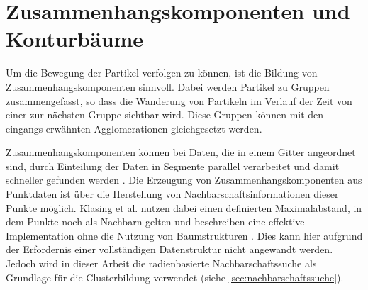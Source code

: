 

\section{Zusammenhangskomponenten und Konturbäume}

Um die Bewegung der Partikel verfolgen zu können, ist die Bildung von Zusammenhangskomponenten sinnvoll. Dabei werden Partikel zu Gruppen zusammengefasst, so dass die Wanderung von Partikeln im Verlauf der Zeit von einer zur nächsten Gruppe sichtbar wird. Diese Gruppen können mit den eingangs erwähnten Agglomerationen gleichgesetzt werden.

Zusammenhangskomponenten können bei Daten, die in einem Gitter angeordnet sind, durch Einteilung der Daten in Segmente parallel verarbeitet und damit schneller gefunden werden \cite{trevor2013efficient}. Die Erzeugung von Zusammenhangskomponenten aus Punktdaten ist über die Herstellung von Nachbarschaftsinformationen dieser Punkte möglich. Klasing et al. nutzen dabei einen definierten Maximalabstand, in dem Punkte noch als Nachbarn gelten und beschreiben eine effektive Implementation ohne die Nutzung von Baumstrukturen \cite{klasing2008efficientSegmentationOf3DLaserData}. Dies kann hier aufgrund der Erfordernis einer vollständigen Datenstruktur nicht angewandt werden. Jedoch wird in dieser Arbeit die radienbasierte Nachbarschaftssuche als Grundlage für die Clusterbildung verwendet (siehe \autoref{sec:nachbarschaftssuche}).


